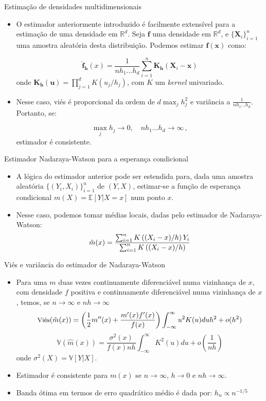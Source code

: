 \documentclass[11pt]{beamer}
\begin{document}
	\begin{frame}{Estimação de densidades multidimensionais}
		\begin{itemize}
			\item O estimador anteriormente introduzido é facilmente extensível para a estimação de uma densidade em $\mathbb{R}^d$. Seja $\boldsymbol{f}$ uma densidade em $\mathbb{R}^d$, e $\{\boldsymbol{X}_i\}_{i=1}^n$ uma amostra aleatória desta distribuição. Podemos estimar $\boldsymbol{f}(\boldsymbol{x})$ como:
			
			$$\hat{\boldsymbol{f}}_{\boldsymbol{h}}(x) = \frac{1}{nh_1\ldots h_d}\sum_{i=1}^n \boldsymbol{K}_{\boldsymbol{h}}\left(\boldsymbol{X}_i - \boldsymbol{x}\right)$$
			onde $\boldsymbol{K}_{\boldsymbol{h}}(\boldsymbol{u}) =\prod_{j=1}^d K(u_j/h_j)$, com $K$ um \textit{kernel} univariado.
			\item Nesse caso, viés é proporcional da ordem de $d \max_j h^2_j$ e variância a $\frac{1}{nh_1\ldots h_d}$. Portanto, se:
			
			$$\max_j h_j \to 0,\quad  nh_1\ldots h_d \to \infty \, ,$$
			estimador é consistente.
		\end{itemize}
	\end{frame}
	
	\begin{frame}{Estimador Nadaraya-Watson para a esperança condicional}
		\begin{itemize}
			\item A lógica do estimador anterior pode ser estendida para, dada uma amostra aleatória $\{(Y_i,X_i)\}_{i=1}^n$ de  $(Y,X)$, estimar-se a função de esperança condicional $m(X) = \mathbb{E}[Y|X=x]$ num ponto ${x}$.
			\item Nesse caso, podemos tomar médias locais, dadas pelo estimador de {\color{blue}Nadaraya-Watson}:
			$$\small \hat{m}(x) = \frac{\sum_{i=1}^n K\left( (X_i-x)/h\right) Y_i}{\sum_{i=1}^n K\left((X_i-x)/h \right)}$$
			
		\end{itemize}
	\end{frame}
	\begin{frame}{Viés e variância do estimador de Nadaraya-Watson}
		\begin{itemize}
			\item 	Para uma $m$ duas vezes continuamente diferenciável numa vizinhança de ${x}$, com densidade $f$ positiva e continuamente diferenciável numa vizinhança de ${x}$, temos, se $n\to \infty$ e $nh\to \infty$
			$$\small \text{Vi\'{e}s}(\hat{m}(x)) = \left(\frac{1}{2} m^{\prime \prime}(x)+\frac{m^{\prime}(x) f^{\prime}(x)}{f(x)}\right) \int_{-\infty}^{\infty} u^{2} K(u) d u h^{2} + o(h^2)$$
			$$\mathbb{V}(\hat{m}(x)) = \frac{\sigma^{2}(x)}{f(x) n h} \int_{-\infty}^{\infty} K^{2}(u) d u + o\left(\frac{1}{nh}\right)$$
			onde $\sigma^2(X) = \mathbb{V}[Y|X]$.
			\item Estimador é consistente para $m(x)$ se $n\to \infty$, $h\to 0$ e $nh\to \infty$.
			\item Banda ótima em termos de erro quadrático médio é dada por:
			$h_n \propto n^{-1/5}$
		\end{itemize}

	\end{frame}
\end{document}
